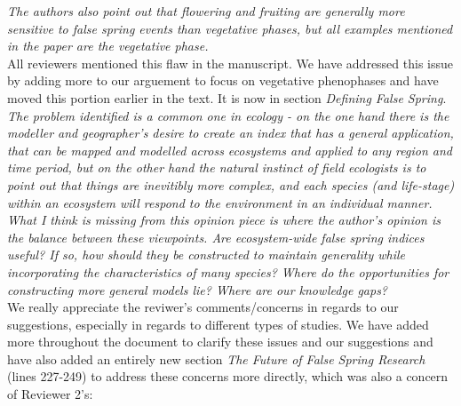 \documentclass[11pt,a4paper]{article}
\begin{document}
\textit{The authors also point out that flowering and fruiting are generally more sensitive to false spring events than vegetative phases, but all examples mentioned in the paper are the vegetative phase.} \\

All reviewers mentioned this flaw in the manuscript. We have addressed this issue by adding more to our arguement to focus on vegetative phenophases and have moved this portion earlier in the text. It is now in section \textit{Defining False Spring}. \\

\textit{The problem identified is a common one in ecology - on the one hand there is the modeller and geographer's desire to create an index that has a general application, that can be mapped and modelled across ecosystems and applied to any region and time period, but on the other hand the natural instinct of field ecologists is to point out that things are inevitibly more complex, and each species (and life-stage) within an ecosystem will respond to the environment in an individual manner. What I think is missing from this opinion piece is where the author's opinion is the balance between these viewpoints.  Are ecosystem-wide false spring indices useful?  If so, how should they be constructed to maintain generality while incorporating the characteristics of many species?  Where do the opportunities for constructing more general models lie? Where are our knowledge gaps?} \\

We really appreciate the reviwer's comments/concerns in regards to our suggestions, especially in regards to different types of studies. We have added more throughout the document to clarify these issues and our suggestions and have also added an entirely new section \textit{The Future of False Spring Research} (lines 227-249) to address these concerns more directly, which was also a concern of Reviewer 2's: \\
\end{document}
